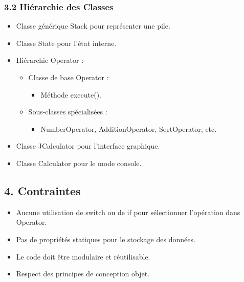 \documentclass[12pt]{report}
\begin{document}
                \subsubsection*{3.2 Hiérarchie des Classes}
                    \begin{itemize}
                        \item Classe générique Stack pour représenter une pile.
                        \item Classe State pour l'état interne.
                        \item Hiérarchie Operator :
                        \begin{itemize}
                            \item Classe de base Operator :
                            \begin{itemize}
                                \item Méthode execute().
                            \end{itemize}

                            \item Sous-classes spécialisées :
                            \begin{itemize}
                                \item NumberOperator, AdditionOperator, SqrtOperator, etc.
                            \end{itemize}
                        \end{itemize}

                        \item Classe JCalculator pour l'interface graphique.
                        \item Classe Calculator pour le mode console.
                    \end{itemize}
            \subsection*{4. Contraintes}
                \begin{itemize}
                    \item Aucune utilisation de switch ou de if pour sélectionner l'opération dans Operator.
                    \item Pas de propriétés statiques pour le stockage des données.
                    \item Le code doit être modulaire et réutilisable.
                    \item Respect des principes de conception objet.
                \end{itemize}
\end{document}
